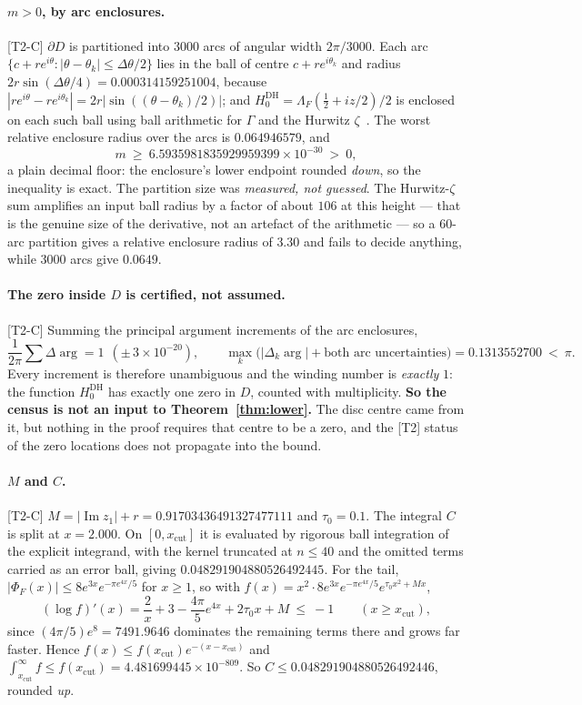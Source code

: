 \documentclass[11pt,a4paper]{article}
\theoremstyle{remark}
\newcommand{\tier}[1]{{\small\textsf{[#1]}}}
\newcommand{\PhiF}{\Phi_F}
\newcommand{\HDH}{H^{\mathrm{DH}}}
\begin{document}
\paragraph{$m>0$, by arc enclosures.} \tier{T2-C} $\partial D$ is partitioned into
$3000$ arcs of angular width $2\pi/3000$. Each arc
$\{c+re^{i\theta}:|\theta-\theta_k|\le\Delta\theta/2\}$ lies in the ball of centre
$c+re^{i\theta_k}$ and radius $2r\sin(\Delta\theta/4)=0.000314159251004$, because
$|re^{i\theta}-re^{i\theta_k}|=2r|\sin((\theta-\theta_k)/2)|$; and
$\HDH_0=\Lambda_F(\tfrac12+iz/2)/2$ is enclosed on each such ball using ball arithmetic for
$\Gamma$ and the Hurwitz $\zeta$~\cite{Arb}. The worst relative enclosure radius over the
arcs is $0.064946579$, and
\[
  m\ \ge\ 6.5935981835929959399\times10^{-30}\ >\ 0 ,
\]
a plain decimal floor: the enclosure's lower endpoint rounded \emph{down}, so the inequality
is exact. The partition size was \emph{measured, not guessed}. The Hurwitz-$\zeta$ sum
amplifies an input ball radius by a factor of about $106$ at this height --- that is the
genuine size of the derivative, not an artefact of the arithmetic --- so a $60$-arc
partition gives a relative enclosure radius of $3.30$ and fails to decide anything, while
$3000$ arcs give $0.0649$.

\paragraph{The zero inside $D$ is certified, not assumed.} \tier{T2-C} Summing the principal
argument increments of the arc enclosures,
\[
  \frac{1}{2\pi}\sum\Delta\arg = 1\ \ (\pm\,3\times10^{-20}),\qquad
  \max_k\bigl(|\Delta_k\arg|+\text{both arc uncertainties}\bigr)=0.1313552700\ <\ \pi .
\]
Every increment is therefore unambiguous and the winding number is \emph{exactly} $1$: the
function $\HDH_0$ has exactly one zero in $D$, counted with multiplicity. \textbf{So the
census is not an input to Theorem~\ref{thm:lower}.} The disc centre came from it, but
nothing in the proof requires that centre to be a zero, and the \tier{T2} status of the
zero locations does not propagate into the bound.

\paragraph{$M$ and $C$.} \tier{T2-C} $M=|\operatorname{Im}z_1|+r=0.91703436491327477111$ and
$\tau_0=0.1$. The integral $C$ is split at $x=2.000$. On $[0,x_{\mathrm{cut}}]$ it is
evaluated by rigorous ball integration of the explicit integrand, with the kernel truncated
at $n\le40$ and the omitted terms carried as an error ball, giving
$0.048291904880526492445$. For the tail, $|\PhiF(x)|\le8e^{3x}e^{-\pi e^{4x}/5}$ for
$x\ge1$, so with $f(x)=x^2\cdot8e^{3x}e^{-\pi e^{4x}/5}e^{\tau_0x^2+Mx}$,
\[
  (\log f)'(x)=\frac2x+3-\frac{4\pi}{5}e^{4x}+2\tau_0x+M\ \le\ -1
  \qquad (x\ge x_{\mathrm{cut}}),
\]
since $(4\pi/5)e^{8}=7491.9646$ dominates the remaining terms there and grows far faster.
Hence $f(x)\le f(x_{\mathrm{cut}})e^{-(x-x_{\mathrm{cut}})}$ and
$\int_{x_{\mathrm{cut}}}^\infty f\le f(x_{\mathrm{cut}})=4.481699445\times10^{-809}$. So
$C\le0.048291904880526492446$, rounded \emph{up}.
\end{document}
